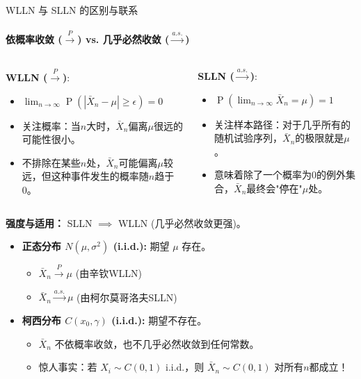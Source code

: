 \documentclass[UTF8]{beamer}
\DeclareMathOperator{\Prob}{\operatorname{P}}
\begin{document}
\begin{frame}[shrink=5]{WLLN 与 SLLN 的区别与联系}
    \framesubtitle{依概率收敛 ($\xrightarrow{P}$) vs. 几乎必然收敛 ($\xrightarrow{a.s.}$)}
    \begin{columns}[T]
      \begin{column}{0.5\textwidth}
        \textbf{WLLN ($\xrightarrow{P}$)}:
        \begin{itemize}
            \item $\lim_{n \to \infty} \Prob(|\bar{X}_n - \mu| \geq \epsilon) = 0$
            \item 关注\alert{概率}：当$n$大时，$\bar{X}_n$偏离$\mu$很远的\alert{可能性}很小。
            \item 不排除在某些$n$处，$\bar{X}_n$可能偏离$\mu$较远，但这种事件发生的概率随$n$趋于0。
        \end{itemize}
      \end{column}
      \begin{column}{0.5\textwidth}
        \textbf{SLLN ($\xrightarrow{a.s.}$)}:
        \begin{itemize}
            \item $\Prob(\lim_{n \to \infty} \bar{X}_n = \mu) = 1$
            \item 关注\alert{样本路径}：对于\alert{几乎所有}的随机试验序列，$\bar{X}_n$的极限\alert{就是}$\mu$。
            \item 意味着除了一个概率为0的例外集合，$\bar{X}_n$最终会"停在"$\mu$处。
        \end{itemize}
      \end{column}
    \end{columns}
    \pause
    \textbf{强度与适用：} SLLN $\implies$ WLLN (几乎必然收敛更强)。
    \begin{itemize}
        \item \textbf{正态分布 $N(\mu, \sigma^2)$ (i.i.d.):} 期望 $\mu$ 存在。
            \begin{itemize}
                \item $\bar{X}_n \xrightarrow{P} \mu$ (由辛钦WLLN)
                \item $\bar{X}_n \xrightarrow{a.s.} \mu$ (由柯尔莫哥洛夫SLLN)
            \end{itemize}
        \item \textbf{柯西分布 $C(x_0, \gamma)$ (i.i.d.):} 期望不存在。
            \begin{itemize}
                \item $\bar{X}_n$ \alert{不}依概率收敛，也\alert{不}几乎必然收敛到任何常数。
                \item \alert{惊人事实}：若 $X_i \sim C(0,1)$ i.i.d.，则 $\bar{X}_n \sim C(0,1)$ 对所有$n$都成立！
            \end{itemize}
    \end{itemize}
\end{frame}
\end{document}

